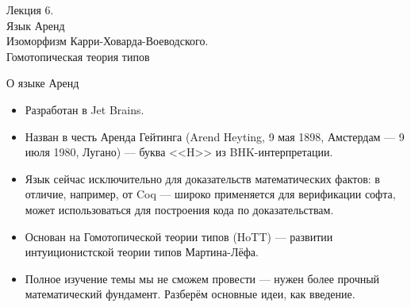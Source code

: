 \documentclass[aspectratio=169,dvipsnames,usenames]{beamer}
\begin{document}
\newtheorem{dfn}{Определение}[section]
\newtheorem{nte}{Замечание}[section]

\newtheorem{axiom}{Аксиома}[section]
\newtheorem{thm}{Теорема}[section]
\newtheorem{lmm}[theorem]{Лемма}
\newtheorem{statement}{Утверждение}[section]
\newtheorem{oun_paragraph}{Пункт}[section]
\newtheorem{cons}{Следствие}[section]
\newtheorem*{exm}{Пример}

\newcommand{\comb}[1]{\operatorname{\bf{\textrm{#1}}}}
\newcommand{\func}[1]{\operatorname{#1}}
\newcommand{\reduction}[1]{{\color{OrangeRed}#1}}
\newcommand{\set}[1]{\left\{#1\right\}}

\def\from#1{\par \parbox{0.7\textwidth}{\par \hfill\raggedleft \it #1}} 

\begin{frame}{}
\begin{center}\Large Лекция 6. \\Язык Аренд \\Изоморфизм Карри-Ховарда-Воеводского.\\Гомотопическая теория типов\end{center}
\end{frame}

\begin{frame}{О языке Аренд}
\begin{itemize}
\item Разработан в Jet Brains.
\item Назван в честь Аренда Гейтинга (Arend Heyting, 9 мая 1898, Амстердам — 9 июля 1980, Лугано) --- буква <<H>> из BHK-интерпретации.
\item Язык сейчас исключительно для доказательств математических фактов: в отличие, например, от Coq ---
широко применяется для верификации софта, может использоваться для построения кода по доказательствам.
\item Основан на Гомотопической теории типов (HoTT) --- развитии интуиционистской теории типов Мартина-Лёфа.
\item Полное изучение темы мы не сможем провести --- нужен более прочный математический фундамент.
Разберём основные идеи, как введение.
\end{itemize}
\end{frame}
\end{document}
